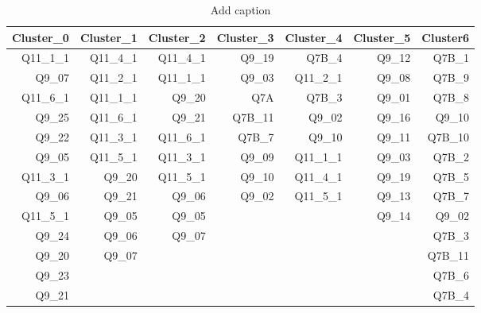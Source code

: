 \documentclass{article}
\begin{document}
\begin{table}[htbp]
  \centering
  \caption{Add caption}
    \begin{tabular}{rrrrrrr}
    \toprule
    Cluster\_0 & Cluster\_1 & Cluster\_2 & Cluster\_3 & Cluster\_4 & Cluster\_5 & Cluster6 \\
    \midrule
    Q11\_1\_1 & Q11\_4\_1 & Q11\_4\_1 & Q9\_19 & Q7B\_4 & Q9\_12 & Q7B\_1 \\
    Q9\_07 & Q11\_2\_1 & Q11\_1\_1 & Q9\_03 & Q11\_2\_1 & Q9\_08 & Q7B\_9 \\
    Q11\_6\_1 & Q11\_1\_1 & Q9\_20 & Q7A   & Q7B\_3 & Q9\_01 & Q7B\_8 \\
    Q9\_25 & Q11\_6\_1 & Q9\_21 & Q7B\_11 & Q9\_02 & Q9\_16 & Q9\_10 \\
    Q9\_22 & Q11\_3\_1 & Q11\_6\_1 & Q7B\_7 & Q9\_10 & Q9\_11 & Q7B\_10 \\
    Q9\_05 & Q11\_5\_1 & Q11\_3\_1 & Q9\_09 & Q11\_1\_1 & Q9\_03 & Q7B\_2 \\
    Q11\_3\_1 & Q9\_20 & Q11\_5\_1 & Q9\_10 & Q11\_4\_1 & Q9\_19 & Q7B\_5 \\
    Q9\_06 & Q9\_21 & Q9\_06 & Q9\_02 & Q11\_5\_1 & Q9\_13 & Q7B\_7 \\
    Q11\_5\_1 & Q9\_05 & Q9\_05 &       &       & Q9\_14 & Q9\_02 \\
    Q9\_24 & Q9\_06 & Q9\_07 &       &       &       & Q7B\_3 \\
    Q9\_20 & Q9\_07 &       &       &       &       & Q7B\_11 \\
    Q9\_23 &       &       &       &       &       & Q7B\_6 \\
    Q9\_21 &       &       &       &       &       & Q7B\_4 \\
    \bottomrule
    \end{tabular}
  \label{tab:top}
\end{table}
\end{document}

